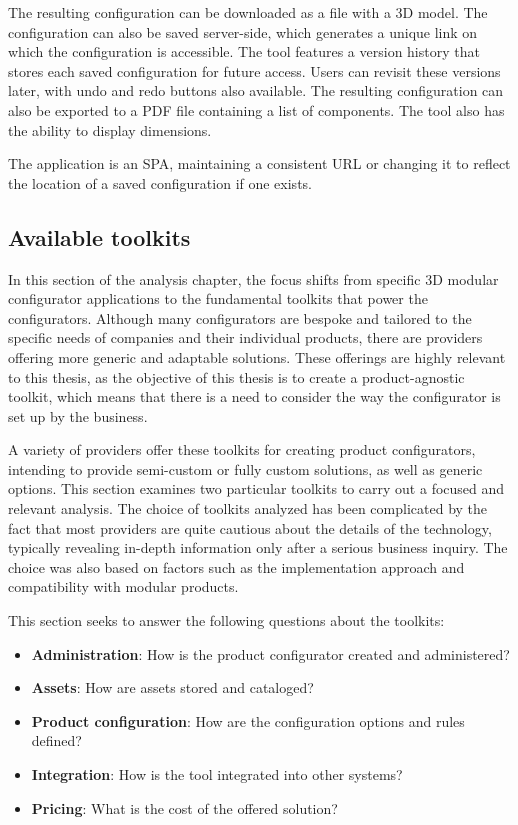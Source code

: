 The resulting configuration can be downloaded as a file with a 3D model. The configuration can also be saved server-side, which generates a unique link on which the configuration is accessible. The tool features a version history that stores each saved configuration for future access. Users can revisit these versions later, with undo and redo buttons also available. The resulting configuration can also be exported to a PDF file containing a list of components. The tool also has the ability to display dimensions.

The application is an SPA, maintaining a consistent URL or changing it to reflect the location of a saved configuration if one exists.


\subsection{Available toolkits}

In this section of the analysis chapter, the focus shifts from specific 3D modular configurator applications to the fundamental toolkits that power the configurators. Although many configurators are bespoke and tailored to the specific needs of companies and their individual products, there are providers offering more generic and adaptable solutions. These offerings are highly relevant to this thesis, as the objective of this thesis is to create a product-agnostic toolkit, which means that there is a need to consider the way the configurator is set up by the business.

A variety of providers offer these toolkits for creating product configurators, intending to provide semi-custom or fully custom solutions, as well as generic options. This section examines two particular toolkits to carry out a focused and relevant analysis. The choice of toolkits analyzed has been complicated by the fact that most providers are quite cautious about the details of the technology, typically revealing in-depth information only after a serious business inquiry. The choice was also based on factors such as the implementation approach and compatibility with modular products.

\noindent This section seeks to answer the following questions about the toolkits: 
\begin{itemize}[label=\rectanglebullet]
    \item \textbf{Administration}: How is the product configurator created and administered?
    \item \textbf{Assets}: How are assets stored and cataloged?
    \item \textbf{Product configuration}: How are the configuration options and rules defined?
    \item \textbf{Integration}: How is the tool integrated into other systems?
    \item \textbf{Pricing}: What is the cost of the offered solution?
\end{itemize}
